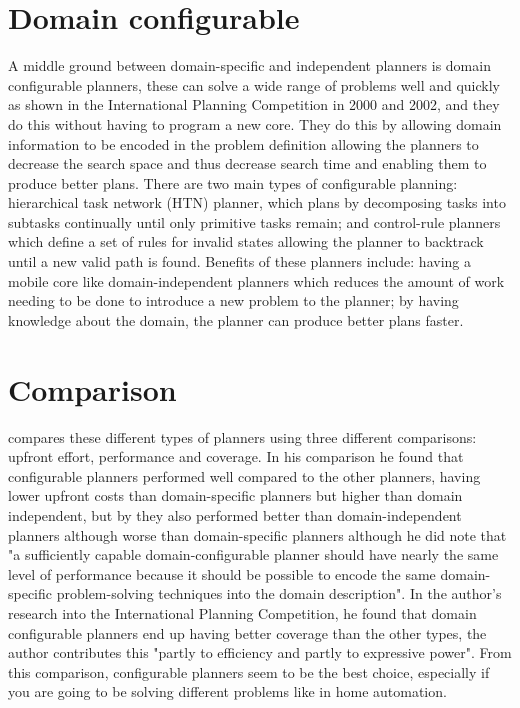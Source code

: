 \section{Domain configurable} \label{section:domain-configurable}
A middle ground between domain-specific and independent planners is domain
configurable planners, these can solve a wide range of problems well and quickly
as shown in the International Planning Competition in 2000 and 2002, and they do
this without having to program a new core. They do this by allowing domain
information to be encoded in the problem definition allowing the planners to
decrease the search space and thus decrease search time and enabling them to
produce better plans. There are two main types of configurable planning:
hierarchical task network (HTN) planner, which plans by decomposing tasks into
subtasks continually until only primitive tasks remain; and control-rule
planners which define a set of rules for invalid states allowing the planner to
backtrack until a new valid path is found. Benefits of these planners include:
having a mobile core like domain-independent planners which reduces the amount
of work needing to be done to introduce a new problem to the planner; by having
knowledge about the domain, the planner can produce better plans faster.

\section{Comparison}
\cite{Nau2007} compares these different types of planners using three different
comparisons: upfront effort, performance and coverage. In his comparison he
found that configurable planners performed well compared to the other planners,
having lower upfront costs than domain-specific planners but higher than domain
independent, but by they also performed better than domain-independent planners
although worse than domain-specific planners although he did note that "a
sufficiently capable domain-configurable planner should have nearly the same
level of performance because it should be possible to encode the same
domain-specific problem-solving techniques into the domain description". In the
author's research into the International Planning Competition, he found that
domain configurable planners end up having better coverage than the other types,
the author contributes this "partly to efficiency and partly to expressive
power". From this comparison, configurable planners seem to be the best choice,
especially if you are going to be solving different problems like in home
automation.

